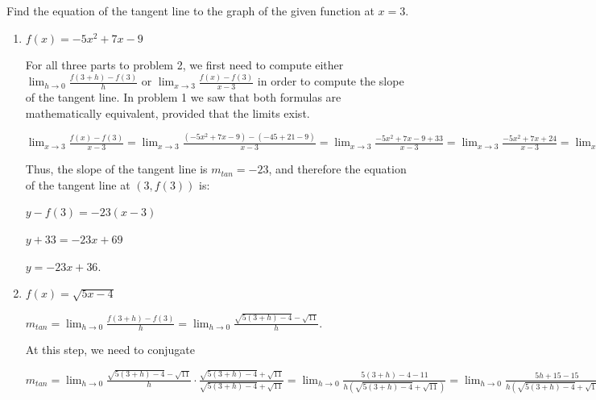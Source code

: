 \documentclass[nooutcomes]{ximera}
\begin{document}
	
	
	
			
			

\begin{problem}
Find the equation of the tangent line to the graph of the given function at $x=3$.

	\begin{enumerate}
	
	\item  $f(x) = -5x^2 + 7x - 9$
		\begin{freeResponse}
		For all three parts to problem 2, we first need to compute either $\lim_{h \to 0} \frac{f(3+h) - f(3)}{h}$ or $\lim_{x \to 3} \frac{f(x) - f(3)}{x-3}$ in order to compute the slope of the tangent line.  In problem 1 we saw that both formulas are mathematically equivalent, provided that the limits exist.  
		
		$\lim_{x \to 3} \frac{f(x) - f(3)}{x-3}
		= \lim_{x \to 3} \frac{(-5x^2 + 7x - 9) - (-45 + 21 - 9)}{x-3}
		= \lim_{x \to 3} \frac{-5x^2 + 7x - 9 + 33}{x-3}
		= \lim_{x \to 3} \frac{-5x^2 + 7x + 24}{x-3}
		= \lim_{x \to 3} \frac{(x-3)(-5x -8)}{x-3}
		= \lim_{x \to 3} (-5x - 8)
		= -5(3) - 8
		= -23.$
		
		Thus, the slope of the tangent line is $m_{tan}=-23$, and therefore the equation of the tangent line at $(3, f(3))$ is:
		
		$y - f(3) = -23(x-3)$
		
		$y + 33 = -23x + 69$
		
		$y = -23x + 36.$
		\end{freeResponse}
		
		
		
	
	\item  $f(x) = \sqrt{5x-4}$
		\begin{freeResponse}
		$m_{tan} = \lim_{h \to 0} \frac{f(3+h) - f(3)}{h}
		= \lim_{h \to 0} \frac{\sqrt{5(3+h) - 4} - \sqrt{11}}{h}.$
		
		At this step, we need to conjugate
		
		$m_{tan} = \lim_{h \to 0} \frac{\sqrt{5(3+h) - 4} - \sqrt{11}}{h} \cdot \frac{\sqrt{5(3+h) - 4} + \sqrt{11}}{\sqrt{5(3+h) - 4} + \sqrt{11}} 
		= \lim_{h \to 0} \frac{5(3+h) - 4 - 11}{h \left( \sqrt{5(3+h) - 4} + \sqrt{11} \right) }
		= \lim_{h \to 0} \frac{5h + 15 - 15}{h \left( \sqrt{5(3+h) - 4} + \sqrt{11} \right) }
		= \lim_{h \to 0} \frac{5}{\left( \sqrt{5(3+h) - 4} + \sqrt{11} \right) }
		= \frac{5}{\sqrt{5(3+0) - 4} + \sqrt{11}}
		= \frac{5}{2 \sqrt{11}}.$
		

\end{freeResponse}
\end{enumerate}
\end{problem}
\end{document}
